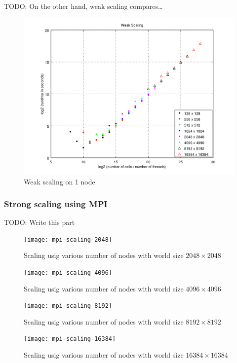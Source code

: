 \documentclass[a4paper]{article}
\newcommand{\todo}[1]{}
\renewcommand{\todo}[1]{{\color{red} TODO: {#1}}}
\begin{document}
\todo{On the other hand, weak scaling compares\ldots} 

\begin{figure}
    \centering
    \includegraphics[width=\textwidth]{weak-scaling}
    \caption{Weak scaling on 1 node}
\end{figure}

\subsubsection{Strong scaling using MPI}

\todo{Write this part}

\begin{figure}
    \centering
    \texttt{[image: mpi-scaling-2048]}
    \caption{Scaling usig various number of nodes with world size $2048 \times 2048$}
\end{figure}

\begin{figure}
    \centering
    \texttt{[image: mpi-scaling-4096]}
    \caption{Scaling usig various number of nodes with world size $4096 \times 4096$}
\end{figure}

\begin{figure}
    \centering
    \texttt{[image: mpi-scaling-8192]}
    \caption{Scaling usig various number of nodes with world size $8192 \times 8192$}
\end{figure}

\begin{figure}
    \centering
    \texttt{[image: mpi-scaling-16384]}
    \caption{Scaling usig various number of nodes with world size $16384 \times 16384$}
\end{figure}
\end{document}
